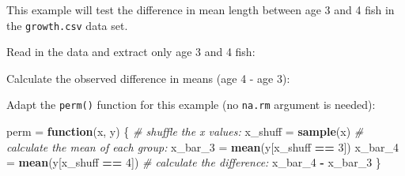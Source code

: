 \documentclass[]{book}
\newenvironment{Shaded}{\begin{snugshade}}{\end{snugshade}}
\newcommand{\CommentTok}[1]{\textcolor[rgb]{0.56,0.35,0.01}{\textit{#1}}}
\newcommand{\ControlFlowTok}[1]{\textcolor[rgb]{0.13,0.29,0.53}{\textbf{#1}}}
\newcommand{\DecValTok}[1]{\textcolor[rgb]{0.00,0.00,0.81}{#1}}
\newcommand{\KeywordTok}[1]{\textcolor[rgb]{0.13,0.29,0.53}{\textbf{#1}}}
\newcommand{\NormalTok}[1]{#1}
\newcommand{\OperatorTok}[1]{\textcolor[rgb]{0.81,0.36,0.00}{\textbf{#1}}}
\newcommand{\StringTok}[1]{\textcolor[rgb]{0.31,0.60,0.02}{#1}}
\begin{document}
This example will test the difference in mean length between age 3 and 4 fish in the \texttt{growth.csv} data set.

Read in the data and extract only age 3 and 4 fish:

\begin{Shaded}
\end{Shaded}

Calculate the observed difference in means (age 4 - age 3):

\begin{Shaded}
\end{Shaded}

Adapt the \texttt{perm()} function for this example (no \texttt{na.rm} argument is needed):

\begin{Shaded}
\begin{Highlighting}[]
\NormalTok{perm =}\StringTok{ }\ControlFlowTok{function}\NormalTok{(x, y) \{}
  \CommentTok{# shuffle the x values:}
\NormalTok{  x_shuff =}\StringTok{ }\KeywordTok{sample}\NormalTok{(x)}
  \CommentTok{# calculate the mean of each group:}
\NormalTok{  x_bar_}\DecValTok{3}\NormalTok{ =}\StringTok{ }\KeywordTok{mean}\NormalTok{(y[x_shuff }\OperatorTok{==}\StringTok{ }\DecValTok{3}\NormalTok{])}
\NormalTok{  x_bar_}\DecValTok{4}\NormalTok{ =}\StringTok{ }\KeywordTok{mean}\NormalTok{(y[x_shuff }\OperatorTok{==}\StringTok{ }\DecValTok{4}\NormalTok{])}
  \CommentTok{# calculate the difference:}
\NormalTok{  x_bar_}\DecValTok{4} \OperatorTok{-}\StringTok{ }\NormalTok{x_bar_}\DecValTok{3}
\NormalTok{\}}
\end{Highlighting}
\end{Shaded}
\end{document}
